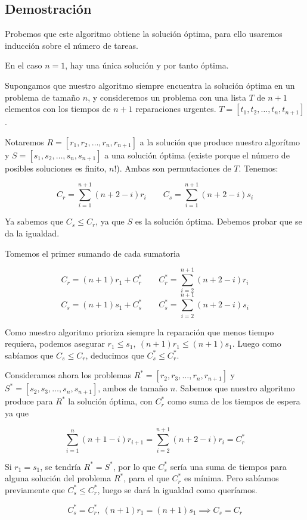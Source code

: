 \documentclass[a4]{article}
\begin{document}
\subsection{Demostración}
Probemos que este algoritmo obtiene la solución óptima, para ello
usaremos inducción sobre el número de tareas.

En el caso $n=1$, hay una única solución y por tanto óptima.

Supongamos que nuestro algoritmo siempre encuentra la solución óptima
en un problema de tamaño $n$, y consideremos un problema con una
lista $T$ de $n+1$ elementos con los tiempos de $n+1$ reparaciones
urgentes.  $T=[t_1,t_2,\ldots,t_n,t_{n+1}]$.

Notaremos $R=[r_1,r_2,\ldots,r_n,r_{n+1}]$ a la solución que produce
nuestro algorítmo y $S=[s_1,s_2,\ldots,s_n,s_{n+1}]$ a una solución
óptima (existe porque el número de posibles soluciones es finito,
$n!$). Ambas son permutaciones de $T$. Tenemos: \vspace{-4mm}

\[C_r = \sum_{i=1}^{n+1} (n+2-i)r_i \qquad C_s = \sum_{i=1}^{n+1} (n+2-i)s_i\]

Ya sabemos que $C_s \leq C_r$, ya que $S$ es la solución
óptima. Debemos probar que se da la igualdad.

Tomemos el primer sumando de cada sumatoria

\[C_r = (n+1)r_1 + C_r^* \qquad C_r^* = \sum_{i=2}^{n+1}(n+2-i)r_i\]
\[C_s = (n+1)s_1 + C_s^* \qquad C_s^* = \sum_{i=2}^{n+1}(n+2-i)s_i\]


Como nuestro algoritmo prioriza siempre la reparación que menos tiempo
requiera, podemos asegurar $r_1 \leq s_1, \ (n+1)r_1 \leq
(n+1)s_1$. Luego como sabíamos que $C_s \leq C_r$, deducimos que
$C_s^* \leq C_r^*$.

Consideramos ahora los problemas $R^*=[r_2,r_3,\ldots,r_n,r_{n+1}]$ y
$S^*=[s_2,s_3,\ldots,s_n,s_{n+1}]$, ambos de tamaño $n$. Sabemos que
nuestro algoritmo produce para $R^*$ la solución óptima, con $C^*_r$
como suma de los tiempos de espera ya que 

\[\sum_{i=1}^n(n+1-i)r_{i+1} = \sum_{i=2}^{n+1}(n+2-i)r_i = C^*_r\]

Si $r_1=s_1$, se tendría $R^*=S^*$, por lo que $C_s^*$ sería una suma
de tiempos para alguna solución del problema $R^*$, para el que $C_r^*$
es mínima. Pero sabíamos previamente que $C_s^* \leq C_r^*$, luego se
dará la igualdad como queríamos.

\[C_s^* = C_r^*, \ (n+1)r_1=(n+1)s_1 \implies C_s = C_r\]
\end{document}
